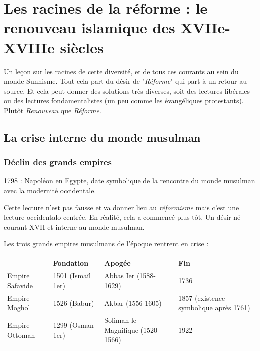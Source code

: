 \chapter{Les racines de la réforme : le
renouveau islamique des XVIIe-XVIIIe
siècles}

Un leçon sur les racines de cette diversité, et de tous ces courants au sein du monde Sunnisme. Tout cela part du désir de "\textit{Réforme}" qui part à un retour au source. Et cela peut donner des solutions très diverses, soit des lectures libérales ou des lectures fondamentalistes (un peu comme les évangéliques protestants).
Plutôt \textit{Renouveau} que \textit{Réforme}.

\section{La crise interne du monde musulman}
\subsection{Déclin des grands empires}

 
 \begin{Synthesis}
 1798 : Napoléon en Egypte, date symbolique de la rencontre du monde musulman avec la modernité occidentale.
 \end{Synthesis}
 Cette lecture n'est pas fausse et va donner lieu au \textit{réformisme} mais c'est une lecture occidentalo-centrée.
 En réalité, cela a commencé plus tôt. Un désir né courant XVII et interne au monde musulman.
 
Les trois grands empires musulmans de l'époque rentrent en crise : 

\begin{table}[h!]


\setlength{}
\footnotesize%
\noindent\begin{tabular}{p{\q}p{\q}p{\q}p{\q}}
\toprule
                & Fondation           & Apogée                            & Fin                                                                                \\
\midrule
Empire Safavide & 1501 (Ismaïl   1er) & Abbas Ier (1588-1629)             & 1736                                                                               \\
Empire Moghol   & 1526 (Babur)        & Akbar (1556-1605)                 &  1857 (existence symbolique après 1761)  \\
Empire Ottoman  & 1299 (Osman 1er)    & Soliman le Magnifique (1520-1566) & 1922                                        \\
\bottomrule
\end{tabular}


    \label{tab:my_label}
\end{table}
 
